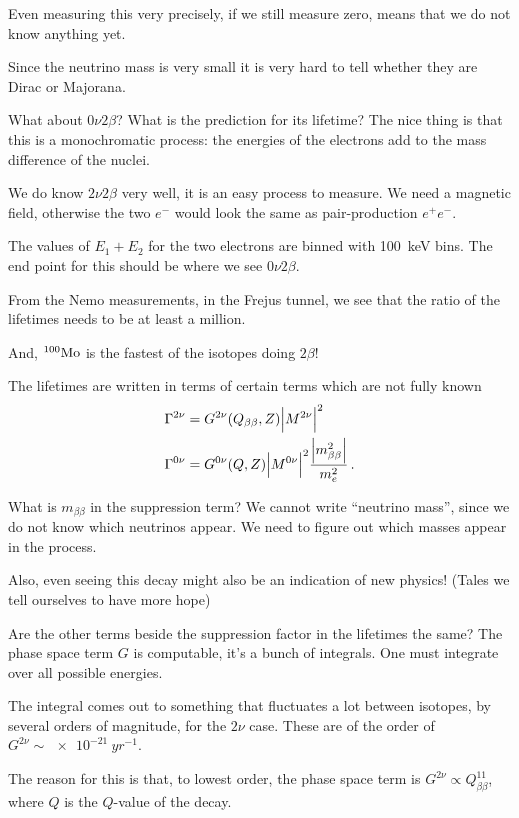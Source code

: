 \documentclass[main.tex]{subfiles}
\begin{document}
Even measuring this very precisely, if we still measure zero, means that 
we do not know anything yet. 

Since the neutrino mass is very small it is very hard to tell 
whether they are Dirac or Majorana.

What about \(0 \nu 2 \beta \)? What is the prediction for its lifetime? 
The nice thing is that this is a monochromatic process: 
the energies of the electrons add to the mass difference of the nuclei.

We do know \(2 \nu 2 \beta \) very well, it is an easy process to measure. 
We need a magnetic field, otherwise the two \(e^{-}\) would look the 
same as pair-production \(e^{+} e^{-}\). 

The values of \(E_1 + E_2\) for the two electrons are binned with \SI{100}{keV} bins. 
The end point for this should be where we see \(0 \nu 2 \beta \). 

From the Nemo measurements, in the Frejus tunnel, we see that the ratio of
the lifetimes needs to be at least a million. 

And, \(^{100} \ce{Mo}\) is the fastest of the isotopes doing \(2 \beta \)!

The lifetimes are written in terms of certain terms which are not fully known
%
\begin{align}
\Gamma^{2 \nu } &= G^{2 \nu } (Q_{\beta \beta }, Z) \abs{M^{2 \nu }}^2  \\
\Gamma^{0 \nu } &= G^{0 \nu } (Q, Z) \abs{M^{0 \nu }}^2 \frac{\abs{m_{ \beta \beta }^2}}{m_e^2}
\,.
\end{align}

What is \(m_{\beta \beta } \) in the suppression term? 
We cannot write ``neutrino mass'', since we do not know which neutrinos appear. 
We need to figure out which masses appear in the process. 

Also, even seeing this decay might also be an indication of new physics! 
(Tales we tell ourselves to have more hope)

Are the other terms beside the suppression factor in the lifetimes the same?
The phase space term \(G\) is computable, it's a bunch of integrals. 
One must integrate over all possible energies. 

The integral comes out to something that fluctuates a lot between isotopes, 
by several orders of magnitude, for the \(2 \nu \) case. 
These are of the order of \(G^{2 \nu } \sim \SI{e-21}{yr^{-1}}\).

The reason for this is that, to lowest order, the phase space term is \(G^{2 \nu } \propto Q_{\beta \beta }^{11}\), 
where \(Q\) is the \(Q\)-value of the decay. 
\end{document}
